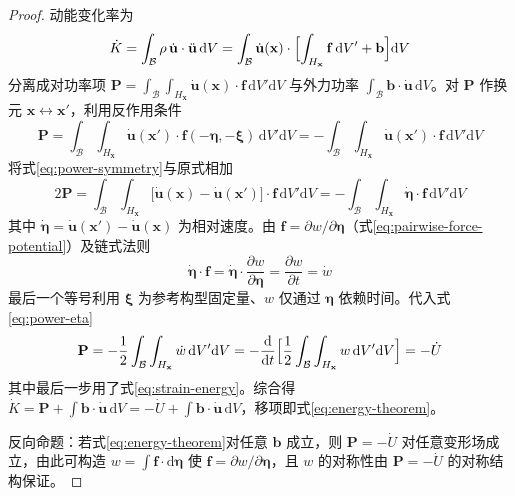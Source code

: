 \begin{proof}
  动能变化率为
  \[
    \dot{K}=\int_{\mathcal{B}}\rho\,\dot{\mathbf{u}}\cdot\ddot{\mathbf{u}}\,\mathrm{d}V=\int_{\mathcal{B}}\dot{\mathbf{u}}(\mathbf{x})\cdot\Bigl[\int_{H_{\mathbf{x}}}\mathbf{f}\,\mathrm{d}V'+\mathbf{b}\Bigr]\mathrm{d}V
  \]
  分离成对功率项 $\mathbf{P}=\int_{\mathcal{B}}\int_{H_{\mathbf{x}}}\dot{\mathbf{u}}(\mathbf{x})\cdot\mathbf{f}\,\mathrm{d}V'\mathrm{d}V$ 与外力功率 $\int_{\mathcal{B}}\mathbf{b}\cdot\dot{\mathbf{u}}\,\mathrm{d}V$。对 $\mathbf{P}$ 作换元 $\mathbf{x}\leftrightarrow\mathbf{x}'$，利用反作用条件
  \begin{equation}
    \mathbf{P}=\int_{\mathcal{B}}\int_{H_{\mathbf{x}}}\dot{\mathbf{u}}(\mathbf{x}')\cdot\mathbf{f}(-\boldsymbol{\eta},-\boldsymbol{\xi})\,\mathrm{d}V'\mathrm{d}V=-\int_{\mathcal{B}}\int_{H_{\mathbf{x}}}\dot{\mathbf{u}}(\mathbf{x}')\cdot\mathbf{f}\,\mathrm{d}V'\mathrm{d}V
    \label{eq:power-symmetry}
  \end{equation}
  将式\eqref{eq:power-symmetry}与原式相加
  \begin{equation}
    2\mathbf{P}=\int_{\mathcal{B}}\int_{H_{\mathbf{x}}}\bigl[\dot{\mathbf{u}}(\mathbf{x})-\dot{\mathbf{u}}(\mathbf{x}')\bigr]\cdot\mathbf{f}\,\mathrm{d}V'\mathrm{d}V=-\int_{\mathcal{B}}\int_{H_{\mathbf{x}}}\dot{\boldsymbol{\eta}}\cdot\mathbf{f}\,\mathrm{d}V'\mathrm{d}V
    \label{eq:power-eta}
  \end{equation}
  其中 $\dot{\boldsymbol{\eta}}=\dot{\mathbf{u}}(\mathbf{x}')-\dot{\mathbf{u}}(\mathbf{x})$ 为相对速度。由 $\mathbf{f}=\partial w/\partial\boldsymbol{\eta}$（式\eqref{eq:pairwise-force-potential}）及链式法则
  \[
    \dot{\boldsymbol{\eta}}\cdot\mathbf{f}=\dot{\boldsymbol{\eta}}\cdot\frac{\partial w}{\partial\boldsymbol{\eta}}=\frac{\partial w}{\partial t}=\dot{w}
  \]
  最后一个等号利用 $\boldsymbol{\xi}$ 为参考构型固定量、$w$ 仅通过 $\boldsymbol{\eta}$ 依赖时间。代入式\eqref{eq:power-eta}
  \begin{equation}
    \mathbf{P}=-\frac{1}{2}\int_{\mathcal{B}}\int_{H_{\mathbf{x}}}\dot{w}\,\mathrm{d}V'\mathrm{d}V=-\frac{\mathrm{d}}{\mathrm{d}t}\Bigl[\frac{1}{2}\int_{\mathcal{B}}\int_{H_{\mathbf{x}}}w\,\mathrm{d}V'\mathrm{d}V\Bigr]=-\dot{U}
    \label{eq:power-strain}
  \end{equation}
  其中最后一步用了式\eqref{eq:strain-energy}。综合得 $\dot{K}=\mathbf{P}+\int\mathbf{b}\cdot\dot{\mathbf{u}}\,\mathrm{d}V=-\dot{U}+\int\mathbf{b}\cdot\dot{\mathbf{u}}\,\mathrm{d}V$，移项即式\eqref{eq:energy-theorem}。

  反向命题：若式\eqref{eq:energy-theorem}对任意 $\mathbf{b}$ 成立，则 $\mathbf{P}=-\dot{U}$ 对任意变形场成立，由此可构造 $w=\int\mathbf{f}\cdot\mathrm{d}\boldsymbol{\eta}$ 使 $\mathbf{f}=\partial w/\partial\boldsymbol{\eta}$，且 $w$ 的对称性由 $\mathbf{P}=-\dot{U}$ 的对称结构保证。
\end{proof}

